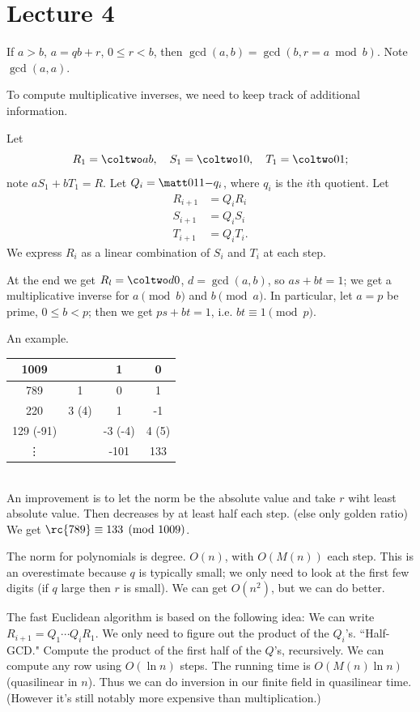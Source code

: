 \section{Lecture 4}
\begin{alg}
If $a>b$, $a=qb+r$, $0\le r<b$, then $\gcd(a,b)=\gcd(b,r=a\bmod b)$. Note $\gcd(a,a)$.
\end{alg}
To compute multiplicative inverses, we need to keep track of additional information.
\begin{alg}
Let
\[
R_1=\coltwo ab, \quad S_1=\coltwo 10, \quad T_1=\coltwo 01;
\]
note $aS_1+bT_1=R$. Let $Q_i=\matt011{-q_i}$, where $q_i$ is the $i$th quotient. Let
\begin{align*}
R_{i+1}&=Q_iR_i\\
S_{i+1}&=Q_iS_i\\
T_{i+1}&=Q_iT_i.
\end{align*}
We express $R_i$ as a linear combination of $S_i$ and $T_i$ at each step.

At the end we get $R_l=\coltwo d0$, $d=\gcd(a,b)$, so $as+bt=1$; we get a multiplicative inverse for $a\pmod b$ and $b\pmod a$. 
In particular, let $a=p$ be prime, $0\le b<p$; then we get $ps+bt=1$, i.e. $bt\equiv 1\pmod p$.
\end{alg}
An example.

\noindent
\begin{tabular}{|c|c|c|c|}
\hline
1009 & & 1 & 0\\
\hline
789 & 1 & 0 & 1\\
\hline
220 & 3 (4) & 1 & -1\\
\hline
129 (-91) & & -3 (-4)& 4 (5)\\
\hline
\vdots & &-101 & 133\\
\hline
\end{tabular}\\

An improvement is to let the norm be the absolute value and take $r$ wiht least absolute value. Then decreases by at least half each step. (else only golden ratio) We get $\rc{789}\equiv 133\pmod{1009}$.

The norm for polynomials is degree. $O(n)$, with $O(M(n))$ each step. This is an overestimate because $q$ is typically small; we only need to look at the first few digits (if $q$ large then $r$ is small). We can get $O(n^2)$, but we can do better.

The fast Euclidean algorithm is based on the following idea: We can write $R_{i+1}=Q_1\cdots Q_iR_1$. We only need to figure out the product of the $Q_i$'s. ``Half-GCD." Compute the product of the first half of the $Q$'s, recursively. We can compute any row using $O(\ln n)$ steps. The running time is $O(M(n)\ln n)$ (quasilinear in $n$). Thus we can do inversion in our finite field in quasilinear time. (However it's still notably more expensive than multiplication.)

